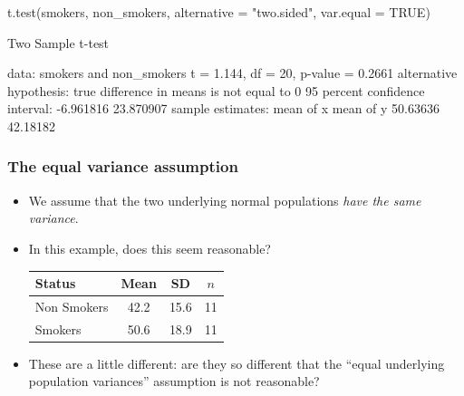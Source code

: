 \documentclass[a4paper]{article}\usepackage[]{graphicx}\usepackage[]{xcolor}
\begin{document}
\begin{Schunk}
\begin{Sinput}
t.test(smokers, non_smokers,
       alternative = "two.sided",
       var.equal = TRUE)
\end{Sinput}
\begin{Soutput}

	Two Sample t-test

data:  smokers and non_smokers
t = 1.144, df = 20, p-value = 0.2661
alternative hypothesis: true difference in means is not equal to 0
95 percent confidence interval:
 -6.961816 23.870907
sample estimates:
mean of x mean of y 
 50.63636  42.18182 
\end{Soutput}
\end{Schunk}
\subsubsection{The equal variance assumption}
\begin{itemize}
	\item We assume that the two underlying normal populations \textit{have the same variance}.
	\item In this example, does this seem reasonable?
	\begin{table}[H]\centering
		\begin{tabular}{@{}lccc@{}}
		\toprule
		Status      & Mean & SD   & \( n \)   \\ \midrule
		Non Smokers & 42.2 & 15.6 & 11 \\
		Smokers     & 50.6 & 18.9 & 11 \\ \bottomrule
		\end{tabular}
	\end{table}
	\item These are a little different: are they so different that the ``equal underlying population variances'' assumption is not reasonable?
\end{itemize}
\end{document}
